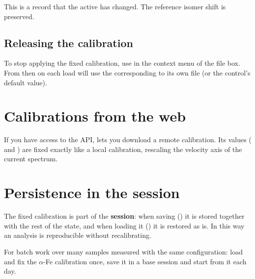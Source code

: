 This is a record that the active  has changed. The reference isomer
shift is preserved.

\subsection{Releasing the calibration}

To stop applying the fixed calibration, use  in
the context menu of the file box. From then on each load will use the
 corresponding to its own file (or the control's default value).

\section{Calibrations from the web}

If you have access to the API,  lets you
download a remote calibration. Its values ( and
) are fixed exactly like a local calibration, rescaling the
velocity axis of the current spectrum.

\section{Persistence in the session}

The fixed calibration is part of the \textbf{session}: when saving
() it is stored together with the rest of the state,
and when loading it () it is restored as is. In this
way an analysis is reproducible without recalibrating.

\begin{truco}
For batch work over many samples measured with the same configuration: load and
fix the $\alpha$-Fe calibration once, save it in a base session and start from it
each day.
\end{truco}
